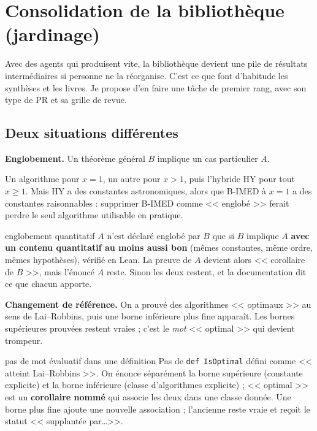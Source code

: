 \documentclass[11pt,a4paper]{article}
\begin{document}
\section{Consolidation de la bibliothèque (jardinage)}\label{sec:jardinage}

Avec des agents qui produisent vite, la bibliothèque devient une pile de résultats intermédiaires si
personne ne la réorganise. C'est ce que font d'habitude les synthèses et les livres. Je propose d'en
faire une tâche de premier rang, avec son type de PR et sa grille de revue.

\subsection{Deux situations différentes}

\textbf{Englobement.} Un théorème général $B$ implique un cas particulier $A$.
\begin{exemple}
Un algorithme pour $x=1$, un autre pour $x>1$, puis l'hybride HY pour tout $x\ge 1$. Mais HY a des
constantes astronomiques, alors que B-IMED à $x=1$ a des constantes raisonnables : supprimer B-IMED
comme << englobé >> ferait perdre le seul algorithme utilisable en pratique.
\end{exemple}

\begin{regle}{englobement quantitatif}
$A$ n'est déclaré englobé par $B$ que si $B$ implique $A$ \textbf{avec un contenu quantitatif au moins aussi
bon} (mêmes constantes, même ordre, mêmes hypothèses), vérifié en Lean. La preuve de $A$ devient alors
<< corollaire de $B$ >>, mais l'énoncé $A$ reste. Sinon les deux restent, et la documentation dit ce que
chacun apporte.
\end{regle}

\textbf{Changement de référence.} On a prouvé des algorithmes << optimaux >> au sens de Lai--Robbins,
puis une borne inférieure plus fine apparaît. Les bornes supérieures prouvées restent vraies ; c'est le
\emph{mot} << optimal >> qui devient trompeur.

\begin{regle}{pas de mot évaluatif dans une définition}
Pas de \texttt{def IsOptimal} défini comme << atteint Lai--Robbins >>. On énonce séparément la borne
supérieure (constante explicite) et la borne inférieure (classe d'algorithmes explicite) ;
<< optimal >> est un \textbf{corollaire nommé} qui associe les deux dans une classe donnée. Une borne plus
fine ajoute une nouvelle association ; l'ancienne reste vraie et reçoit le statut << supplantée par\dots >>.
\end{regle}
\end{document}
